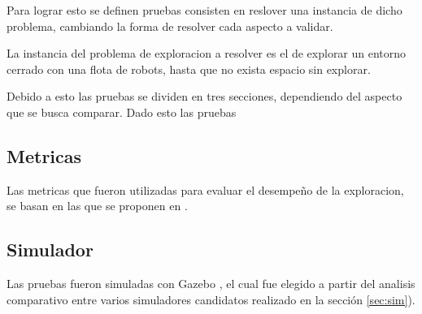 Para lograr esto se definen pruebas consisten en reslover una instancia de
dicho problema, cambiando la forma de resolver cada aspecto a validar.

La instancia del problema de exploracion a resolver es el de explorar un
entorno cerrado con una flota de robots, hasta que no exista espacio sin
explorar.

Debido a esto
las pruebas se dividen en tres secciones, dependiendo del aspecto que se busca comparar.
Dado esto las pruebas







\subsection{Metricas}
Las metricas que fueron utilizadas para evaluar el desempeño de la exploracion,
se basan en las que se proponen en \cite{yan2015metrics}.

\subsection{Simulador}
Las pruebas fueron simuladas con Gazebo \cite{gazebo}, el cual fue elegido a
partir del analisis comparativo entre varios simuladores candidatos realizado
en la sección \ref{sec:sim}). 


